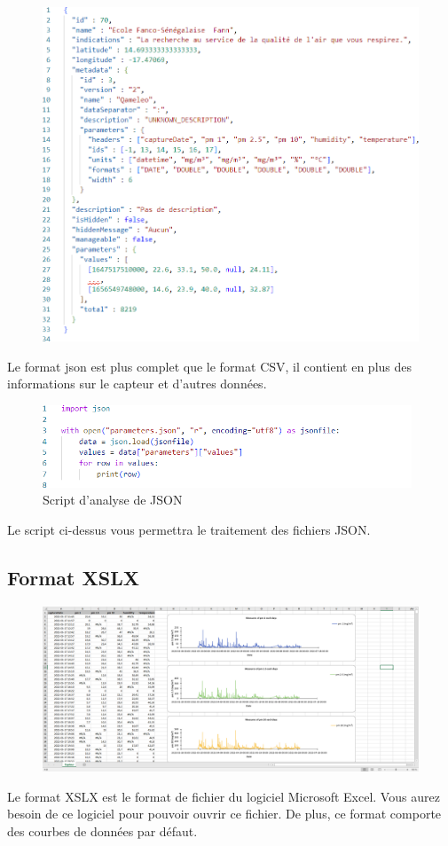    \begin{figure}[H]
        \includegraphics[width=13cm]{resources/json}
        \label{fig:json}
    \end{figure}

    Le format json est plus complet que le format CSV,  il contient en plus des informations sur le capteur et d'autres données.

    \begin{figure}[H]
        \includegraphics[width=11cm]{resources/json_exemple}
        \caption{Script d'analyse de JSON}\label{fig:json-exemple}
    \end{figure}

    Le script ci-dessus vous permettra le traitement des fichiers JSON.

    \subsection{Format XSLX}\label{subsec:xslx}

    \begin{figure}[H]
        \begin{center}
            \includegraphics[width=14cm]{resources/xslx}
        \end{center}\label{fig:xslx}
    \end{figure}

    Le format XSLX est le format de fichier du logiciel Microsoft Excel.
    Vous aurez besoin de ce logiciel pour pouvoir ouvrir ce fichier.
    De plus, ce format comporte des courbes de données par défaut.

    \clearpage

